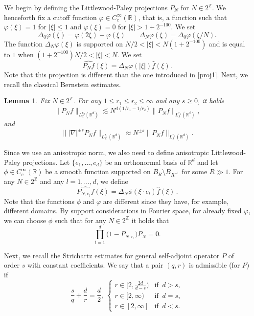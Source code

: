 \documentclass[10pt,leqno]{amsart}
\newtheorem{lem}[thm]{Lemma}
\newcommand{\R}{\mathbb{R}}
\numberwithin{equation}{section}
\newcommand{\Z}{\mathbb{Z}}
\begin{document}
We begin by defining the Littlewood-Paley projections $P_N$ for $N\in 2^{\Z}$. We henceforth fix a cutoff function $\varphi \in C_{c}^{\infty} (\R)$, that is, 
a function such that $\varphi (\xi)=1$ for $|\xi|\leq 1$ and $\varphi (\xi)=0$ for $|\xi|>1+2^{-100}$. We set
\begin{equation}\label{dyadic-anulus-bump}
\Delta_{0}\varphi(\xi)=\varphi(2\xi)-\varphi(\xi)\qquad\Delta_{N}\varphi(\xi)=\Delta_{0}\varphi(\xi/N) .
\end{equation}
The function \(\Delta_{N}\varphi(\xi)\) is supported on \(N/2<|\xi|<N(1+2^{-100})\) and is equal to \(1\) when \((1+2^{-100})N/2<|\xi|<N\). We set
\begin{equation}\label{LPproj}
\widehat{P_N f} (\xi)= \Delta_{N}\varphi(|\xi|)\hat{f} (\xi).
\end{equation} 
Note that this projection is different than the one introduced in \eqref{proj1}. Next, we recall the classical Bernstein estimates.

\begin{lem}
\label{bern}
Fix $N\in 2^{\Z}$. For any $1\leq r_1 \leq r_2 \leq \infty$ and any $s\geq 0$, it holds
$$\|P_N f\|_{L_x^{r_2} (\R^d)}\lesssim N^{d(1/r_1 - 1/r_2)} \|P_N f\|_{L_x^{r_1}(\R^d)},$$
and
$$\||\nabla|^{\pm s} P_N f \|_{L_x^{r_1} (\R^d)} \approx N^{\pm s} \|P_N f\|_{L_x^{r_1} (\R^d)}.$$
\end{lem}
Since we use an anisotropic norm, we also need to define anisotropic Littlewood-Paley projections. Let $\{e_1 ,\ldots, e_d\}$ be an orthonormal basis of $\R^d$
and let $\phi \in C^\infty_c(\R)$ be a smooth function supported on \(B_{R}\setminus B_{R^{-1}}\) for some \(R\gg 1\). For any $N\in 2^{\Z}$ and any $l=1,\ldots ,d$, we define
\begin{equation} \label{LP-anisotropic}
\widehat{P_{N,e_l} f} (\xi) = \Delta_{N}\phi(\xi\cdot e_l)\hat{f} (\xi) \,.
\end{equation}
Note that the functions $\phi$ and $\varphi$ are different since they have, for example, different domains.
 By support considerations in Fourier space, for already fixed $\varphi$, we can choose $\phi$ such that for any \( N \in 2^{\Z}\) it holds that
\begin{equation}
\label{e1}
\prod_{l=1}^{d} \Big( 1-  P_{N,e_l}\Big) P_{N} =0.
\end{equation}


Next, we recall the Strichartz estimates for general self-adjoint operator $P$ of order $s$ with constant coefficients. We say that a pair $(q,r)$ is admissible (for $P$) if
\begin{equation}
\label{defadmissible}
\frac{s}{q} +\frac{d}{r}=\frac{d}{2},\ 
\begin{cases}r\in [2, \frac{2d}{d-s}) & \textrm{if } \ d> s, \\  
r\in [2,\infty ) & \textrm{if } \ d=s,\\ 
r\in [2,\infty] &  \textrm{if } \ d <  s. 
\end{cases}
\end{equation}
\end{document}
